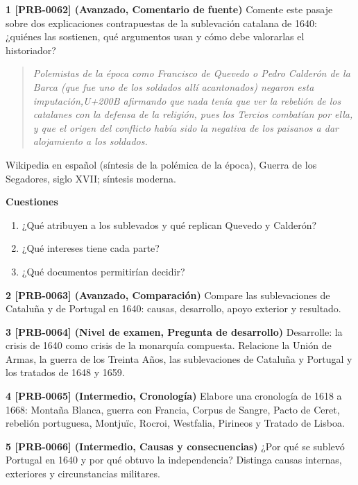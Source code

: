 \documentclass{book}
\begin{document}
\begin{tcolorbox}[title={Ejercicios}, studiumworked, breakable]

\noindent\textbf{1 [PRB-0062] (Avanzado, Comentario de fuente)}
Comente este pasaje sobre dos explicaciones contrapuestas de la sublevación catalana de 1640: ¿quiénes las sostienen, qué argumentos usan y cómo debe valorarlas el historiador?


\begin{quote}
\itshape Polemistas de la época como Francisco de Quevedo o Pedro Calderón de la Barca (que fue uno de los soldados allí acantonados) negaron esta imputación,{U+200B} afirmando que nada tenía que ver la rebelión de los catalanes con la defensa de la religión, pues los Tercios combatían por ella, y que el origen del conflicto había sido la negativa de los paisanos a dar alojamiento a los soldados.
\end{quote}
{\noindent\footnotesize Wikipedia en español (síntesis de la polémica de la época), Guerra de los Segadores, siglo XVII; síntesis moderna.\par}

\noindent\textbf{Cuestiones}
\begin{enumerate}
\item ¿Qué atribuyen a los sublevados y qué replican Quevedo y Calderón?
\item ¿Qué intereses tiene cada parte?
\item ¿Qué documentos permitirían decidir?
\end{enumerate}

\noindent\textbf{2 [PRB-0063] (Avanzado, Comparación)}
Compare las sublevaciones de Cataluña y de Portugal en 1640: causas, desarrollo, apoyo exterior y resultado.


\noindent\textbf{3 [PRB-0064] (Nivel de examen, Pregunta de desarrollo)}
Desarrolle: la crisis de 1640 como crisis de la monarquía compuesta. Relacione la Unión de Armas, la guerra de los Treinta Años, las sublevaciones de Cataluña y Portugal y los tratados de 1648 y 1659.


\noindent\textbf{4 [PRB-0065] (Intermedio, Cronología)}
Elabore una cronología de 1618 a 1668: Montaña Blanca, guerra con Francia, Corpus de Sangre, Pacto de Ceret, rebelión portuguesa, Montjuïc, Rocroi, Westfalia, Pirineos y Tratado de Lisboa.


\noindent\textbf{5 [PRB-0066] (Intermedio, Causas y consecuencias)}
¿Por qué se sublevó Portugal en 1640 y por qué obtuvo la independencia? Distinga causas internas, exteriores y circunstancias militares.

\end{tcolorbox}
\end{document}
